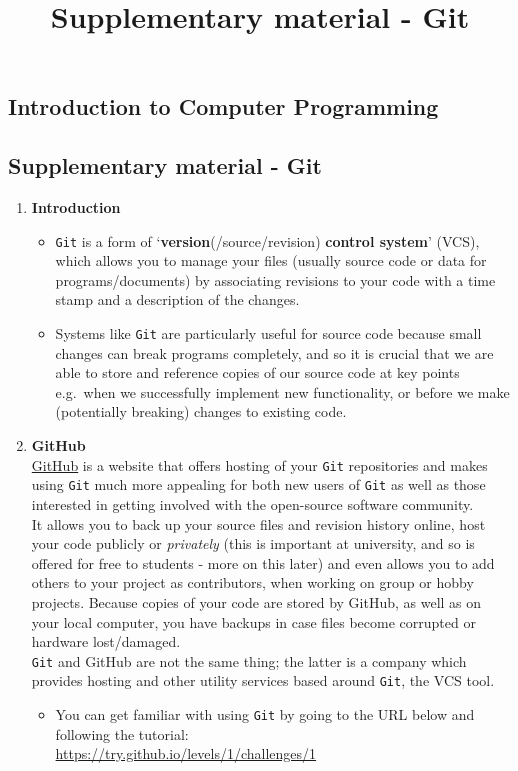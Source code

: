 \documentclass[11pt]{report}
\begin{document}
\title{Supplementary material - Git}
\subsection*{Introduction to Computer Programming}
\subsection*{Supplementary material - Git}
\begin{enumerate}
	\item \textbf{Introduction}
	\begin{itemize}
		\item {\tt Git} is a form of `\textbf{version}(/source/revision) \textbf{control system}' (VCS), which allows you to manage your files (usually source code or data for programs/documents) by associating revisions to your code with a time stamp and a description of the changes.

		\item Systems like {\tt Git} are particularly useful for source code because small changes can break programs completely, and so it is crucial that we are able to store and reference copies of our source code at key points e.g.\ when we successfully implement new functionality, or before we make (potentially breaking) changes to existing code.
	\end{itemize}

	\item {\bf GitHub}\\
	\href{https://github.com/}{GitHub} is a website that offers hosting of your {\tt Git} repositories and makes using {\tt Git} much more appealing for both new users of {\tt Git} as well as those interested in getting involved with the open-source software community.\\
	It allows you to back up your source files and revision history online, host your code publicly or \emph{privately} (this is important at university, and so is offered for free to students - more on this later) and even allows you to add others to your project as contributors, when working on group or hobby projects. Because copies of your code are stored by GitHub, as well as on your local computer, you have backups in case files become corrupted or hardware lost/damaged.\\
	{\tt Git} and GitHub are not the same thing; the latter is a company which provides hosting and other utility services based around {\tt Git}, the VCS tool.
	\begin{itemize}
		\item You can get familiar with using {\tt Git} by going to the URL below and following the tutorial:\\
		\url{https://try.github.io/levels/1/challenges/1}


\end{itemize}
\end{enumerate}
\end{document}
